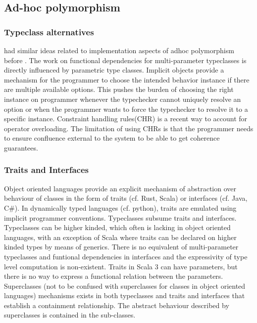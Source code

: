 \documentclass[screen,nonacm]{acmart}
\begin{document}
\subsection{Ad-hoc polymorphism}\label{sec:rw-adhoc-poly}
\subsubsection{Typeclass alternatives}
\citet{kaes_parametric_1988} had similar ideas related to implementation aspects of adhoc
polymorphism before \citet{wadler_polymorphism_1989}. The work on
functional dependencies for multi-parameter typeclasses is directly
influenced by parametric type classes\cite{chen_parametric_1992}.
Implicit objects\cite{oliveira_typeclasses_2010} provide a mechanism for the
programmer to choose the intended behavior instance if there are
multiple available options. This pushes the burden of choosing the
right instance on programmer whenever the typechecker cannot uniquely
resolve an option or when the programmer wants to force the
typechecker to resolve it to a specific instance. Constraint handling
rules(CHR)\cite{fruhwirth_theory_1998,stuckey_theory_2005} is a recent
way to account for operator overloading. The limitation of using CHRs
is that the programmer needs to ensure confluence external to the
system to be able to get coherence guarantees.

\subsubsection{Traits and Interfaces}
Object oriented languages provide an explicit mechanism of abstraction over behaviour of classes in the form of traits (cf. Rust, Scala) or interfaces (cf. Java, C\#). In dynamically typed languages (cf. python), traits are emulated using implicit programmer conventions. Typeclasses subsume traits and interfaces. Typeclasses can be higher kinded, which often is lacking in object oriented languages, with an exception of Scala where traits can be declared on higher kinded types by means of generics. There is no equivalent of multi-parameter typeclasses and funtional dependencies in interfaces and the expressivity of type level computation is non-existent. Traits in Scala 3 can have parameters, but there is no way to express a functional relation between the parameters. Superclasses (not to be confused with superclasses for classes in object oriented languages)  mechanisms exists in both typeclasses and traits and interfaces that establish a containment relationship. The abstract behaviour described by superclasses is contained in the sub-classes.
\end{document}
